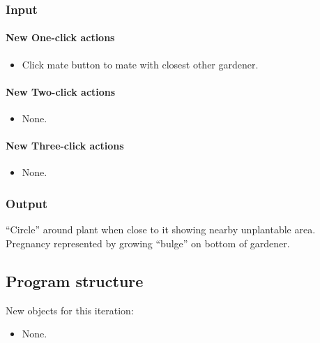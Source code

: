 \documentclass[12pt]{article}
\begin{document}
\subsubsection{Input}

\paragraph{New One-click actions}
\begin{itemize}
\item Click mate button to mate with closest other gardener.
\end{itemize}

\paragraph{New Two-click actions}
\begin{itemize}
\item None.
\end{itemize}

\paragraph{New Three-click actions}
\begin{itemize}
\item None.
\end{itemize}


\subsubsection{Output}
``Circle'' around plant when close to it showing nearby unplantable area.  Pregnancy represented by growing ``bulge'' on bottom of gardener.


\subsection{Program structure}

New objects for this iteration:
\begin{itemize}
\item None.
\end{itemize}
\end{document}

